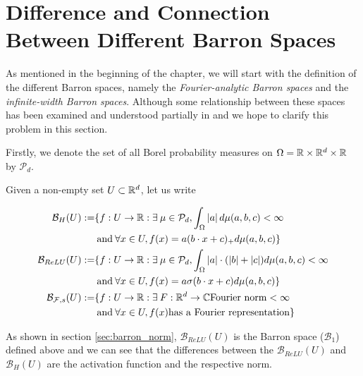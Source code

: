\section{Difference and Connection Between Different Barron Spaces}
\label{sec:diff_barron_spaces}


As mentioned in the beginning of the chapter, we will start with the definition
of the different Barron spaces, namely the \textit{Fourier-analytic Barron
    spaces} and the \textit{infinite-width Barron spaces}. Although some
relationship between these spaces has been examined and understood partially in
\cite{eBarronSpaceFlowinduced2021,eMathematicalUnderstandingNeural2020}  and we
hope to clarify this problem in this section.


Firstly, we denote the set of all Borel probability measures on $\Omega = \mathbb{R}
    \times \mathbb{R}^d \times \mathbb{R}$ by $\mathcal{P}_d$.

Given a non-empty set $U \subset \mathbb{R}^d$, let us write

\begin{align*}
    \mathcal{B}_{H}(U) :=
     & \{f: U \to \mathbb{R}: \exists\: \mu \in \mathcal{P}_d, \int_{\Omega} \left| a \right| d\mu(a, b, c) < \infty                           \\
     & \:\text{and}\: \forall x \in U, f(x) = a (b \cdot x + c)_+ d\mu(a, b, c) \}                                            \\
    \mathcal{B}_{ReLU}(U) :=
     & \{f: U \to \mathbb{R}: \exists\: \mu \in \mathcal{P}_d, \int_{\Omega} \left| a \right| \cdot (\left| b \right| + \left| c \right|) d\mu(a, b, c) < \infty \\
     & \:\text{and}\: \forall x \in U, f(x) = a \sigma(b \cdot x + c) d\mu(a, b, c) \}                                          \\
    \mathcal{B}_{\mathcal{F},s}(U) :=
     & \{f: U \to \mathbb{R}: \exists\: F: \mathbb{R}^d \to \mathbb{C} \text{Fourier norm} < \infty                                           \\
     & \:\text{and}\: \forall x \in U, f(x) \text{has a Fourier representation} \}                                            \\
\end{align*}

As shown in section \ref{sec:barron_norm}, $\mathcal{B}_{ReLU}(U)$ is the Barron
space ($\mathcal{B}_1$) defined above and we can see that the differences
between the $\mathcal{B}_{ReLU}(U)$ and $\mathcal{B}_{H}(U)$ are the activation
function and the respective norm.

